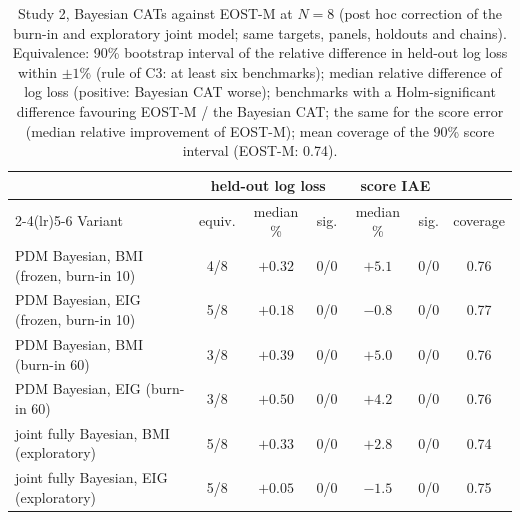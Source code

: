 \begin{table}[tbp]
\centering\footnotesize
\caption{Study 2, Bayesian CATs against EOST-M at $N=8$ (post hoc correction of the burn-in and exploratory joint model; same targets, panels, holdouts and chains). Equivalence: 90\% bootstrap interval of the relative difference in held-out log loss within $\pm1\%$ (rule of C3: at least six benchmarks); median relative difference of log loss (positive: Bayesian CAT worse); benchmarks with a Holm-significant difference favouring EOST-M / the Bayesian CAT; the same for the score error (median relative improvement of EOST-M); mean coverage of the 90\% score interval (EOST-M: 0.74).}
\label{tab:fbfix}
\setlength{\tabcolsep}{3pt}
\begin{tabular}{@{}lcccccc@{}}
\toprule
 & \multicolumn{3}{c}{held-out log loss} & \multicolumn{2}{c}{score IAE} & \\
\cmidrule(lr){2-4}\cmidrule(lr){5-6}
Variant & equiv. & median \% & sig. & median \% & sig. & coverage \\
\midrule
PDM Bayesian, BMI (frozen, burn-in 10) & 4/8 & $+0.32$ & 0/0 & $+5.1$ & 0/0 & 0.76 \\
PDM Bayesian, EIG (frozen, burn-in 10) & 5/8 & $+0.18$ & 0/0 & $-0.8$ & 0/0 & 0.77 \\
PDM Bayesian, BMI (burn-in 60) & 3/8 & $+0.39$ & 0/0 & $+5.0$ & 0/0 & 0.76 \\
PDM Bayesian, EIG (burn-in 60) & 3/8 & $+0.50$ & 0/0 & $+4.2$ & 0/0 & 0.76 \\
joint fully Bayesian, BMI (exploratory) & 5/8 & $+0.33$ & 0/0 & $+2.8$ & 0/0 & 0.74 \\
joint fully Bayesian, EIG (exploratory) & 5/8 & $+0.05$ & 0/0 & $-1.5$ & 0/0 & 0.75 \\
\bottomrule
\end{tabular}
\end{table}
